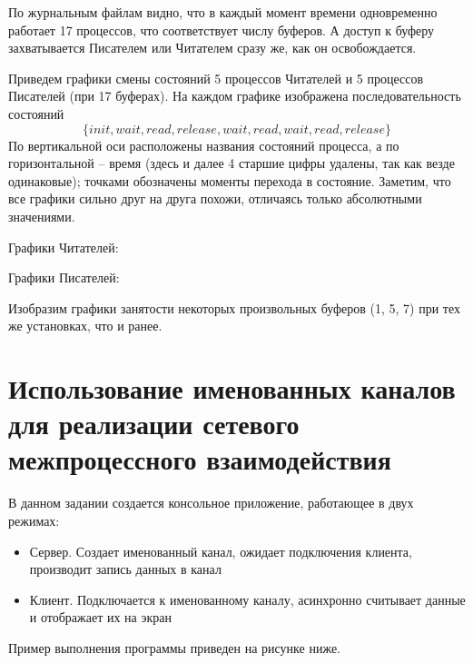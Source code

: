 \documentclass[a4paper,14pt]{extarticle}
\begin{document}
По журнальным файлам видно, что в каждый момент времени одновременно работает
17 процессов, что соответствует числу буферов. А доступ к буферу захватывается
Писателем или Читателем сразу же, как он освобождается.

Приведем графики смены состояний 5 процессов Читателей и 5 процессов Писателей
(при 17 буферах). На каждом графике изображена последовательность состояний
\[
    \{ init, wait, read, release, wait, read, wait, read, release \}
\]
По вертикальной оси расположены названия состояний процесса, а по
горизонтальной -- время (здесь и далее 4 старшие цифры удалены, так как везде
одинаковые); точками обозначены моменты перехода в состояние.  Заметим, что все
графики сильно друг на друга похожи, отличаясь только абсолютными значениями.

\clearpage

Графики Читателей:


Графики Писателей:

Изобразим графики занятости некоторых произвольных буферов (1, 5, 7) при тех же
установках, что и ранее.


\section{Использование именованных каналов для реализации
сетевого межпроцессного взаимодействия}

В данном задании создается консольное приложение, работающее в двух режимах:
\begin{itemize}
    \item Сервер. Создает именованный канал, ожидает подключения клиента,
        производит запись данных в канал
    \item Клиент. Подключается к именованному каналу, асинхронно считывает
        данные и отображает их на экран
\end{itemize}

Пример выполнения программы приведен на рисунке ниже.

\end{document}
